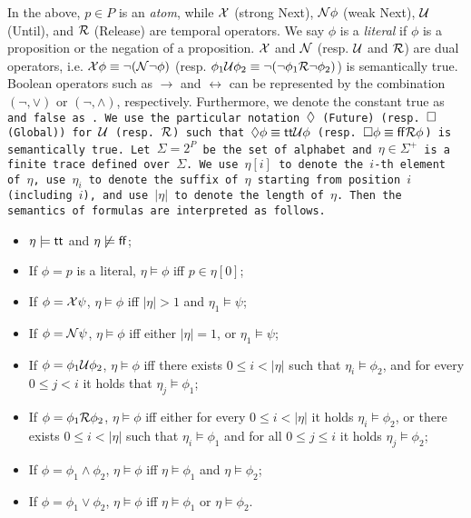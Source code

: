 In the above, $p \in P$ is an \emph{atom}, while $\X$ (strong Next), $\N \phi$ (weak Next), $\U$ (Until), and $\R$ (Release) are temporal operators. We say $\phi$ is a \emph{literal} if $\phi$ is a proposition or the negation of a proposition. $\X$ and $\N$ (resp. $\U$ and $\R$) are dual operators, i.e. $\X\phi\equiv \neg(\N\neg\phi)$ (resp. $\phi_1\U\phi_2 \equiv \neg (\neg\phi_1 \R\neg\phi_2)$) is semantically true. Boolean operators such as $\rightarrow$ and $\leftrightarrow$ can be represented by the combination $(\neg, \vee)$ or $(\neg, \wedge)$, respectively. Furthermore, we denote the constant \textsf{true} as \tt and \textsf{false} as \ff. We use the particular notation $\F$ (Future) (resp. $\G$ (Global)) for $\U$ (resp. $\R$) such that $\F\phi \equiv \tt\U\phi$ (resp. $\G\phi \equiv \ff \R\phi$) is semantically true. Let $\Sigma = 2^P$ be the set of alphabet and $\eta\in\Sigma^+$ is a finite trace defined over $\Sigma$. We use $\eta[i]$ to denote the $i$-th element of $\eta$, use $\eta_i$ to denote the suffix of $\eta$ starting from position $i$ (including $i$), and use $|\eta|$ to denote the length of $\eta$. Then the semantics of \ltlf formulas are interpreted as follows.
\begin{itemize}
\item  $\eta \models \tt$ and $\eta \not\models \ff$;
\item  If $\phi = p$ is a literal, $\eta \models \phi$ iff $p \in \eta[0]$;
\item  If $\phi = \X \psi$, $\eta \models \phi$ iff $|\eta|>1$ and $\eta_{1} \models \psi$;
\item  If $\phi = \N \psi$, $\eta \models \phi$ iff either $|\eta| = 1$, or $\eta_{1} \models \psi$;
\item  If $\phi = \phi_{1} \U \phi_{2}$, $\eta \models\phi$ iff there exists $0 \leq i<|\eta|$ such that $\eta_{i} \models \phi_{2}$, and for every $0 \leq j<i$ it holds that $\eta_{j} \models \phi_{1}$;
\item  If $\phi = \phi_{1} \R \phi_{2}$, $\eta \models \phi$ iff either for every $0 \leq i<|\eta|$ it holds $\eta_{i}\models \phi_{2}$, or there exists $0 \leq i<|\eta|$ such that $\eta_{i} \models \phi_{1}$ and for all $0 \leq j \leq i$ it holds $\eta_{j} \models \phi_{2}$;
\item  If $\phi = \phi_{1} \wedge \phi_{2}$, $\eta \models \phi$ iff $\eta \models \phi_{1}$ and $\eta \models \phi_{2}$;
\item  If $\phi=\phi_{1} \vee \phi_{2}$, $\eta \models \phi$ iff $\eta \models \phi_{1}$ or $\eta \models \phi_{2}$.
\end{itemize}

